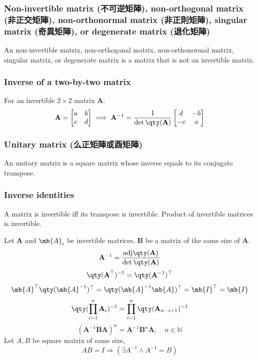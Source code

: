 \documentclass[a4paper,12pt]{report}
\begin{document}
\subsubsection{Non-invertible matrix (不可逆矩陣), non-orthogonal matrix (非正交矩陣), non-orthonormal matrix (非正則矩陣), singular matrix (奇異矩陣), or degenerate matrix (退化矩陣)}
An non-invertible matrix, non-orthogonal matrix, non-orthonormal matrix, singular matrix, or degenerate matrix is a matrix that is not an invertible matrix.
\subsubsection{Inverse of a two-by-two matrix}
For an invertible $2\times 2$ matrix $\mathbf{A}$:
\[\mathbf{A}=\begin{bmatrix}a & b \\c & d\end{bmatrix}\implies\mathbf{A}^{-1}=
\frac{1}{\det\qty(\mathbf{A})}\begin{bmatrix}d & -b \\-c & a\end{bmatrix}\]
\subsubsection{Unitary matrix (么正矩陣或酉矩陣)}
An unitary matrix is a square matrix whose inverse equals to its conjugate transpose.
\subsubsection{Inverse identities}
A matrix is invertible iff its transpose is invertible. Product of invertible matrices is invertible.

Let $\mathbf{A}$ and $\mb{A}_i$ be invertible matrices, $\mathbf{B}$ be a matrix of the same size of $\mathbf{A}$.
\[\mathbf{A}^{-1}=\frac{\mathrm{adj}\qty(\mathbf{A})}{\det\qty(\mathbf{A})}\]
\[\qty(\mathbf{A}^\top)^{-1}=\qty(\mathbf{A}^{-1})^\top\]
\bpr
\[\mb{A}^{\top}\qty(\mb{A}^{-1})^{\top}=\qty(\mb{A}^{-1}\mb{A})^{\top}=\mb{I}^\top=\mb{I}\]
\epr
\[\qty(\prod_{i=1}^n\mathbf{A}_i)^{-1}=\prod_{i=1}^n\qty(\mathbf{A}_{n-i+1})^{-1}\]
\[(\mathbf{A}^{-1}\mathbf{B}\mathbf{A})^n=\mathbf{A}^{-1}\mathbf{B}^n\mathbf{A},\quad n\in\mathbb{N}\]
Let $A,B$ be square matrix of same size,
\[AB=I\Rightarrow(\exists A^{-1}\land A^{-1}=B)\]
\end{document}
